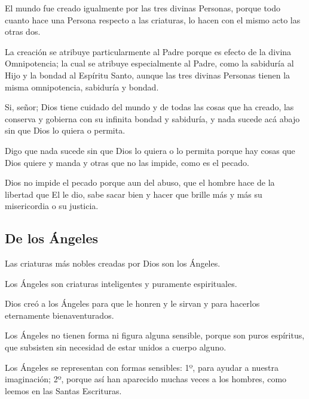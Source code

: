  El mundo fue creado igualmente por las tres divinas Personas, porque todo cuanto hace una Persona respecto a las criaturas, lo hacen con el mismo acto las otras dos.

 La creación se atribuye particularmente al Padre porque es efecto de la divina Omnipotencia; la cual se atribuye especialmente al Padre, como la sabiduría al Hijo y la bondad al Espíritu Santo, aunque las tres divinas Personas tienen la misma omnipotencia, sabiduría y bondad.

 Si, señor; Dios tiene cuidado del mundo y de todas las cosas que ha creado, las conserva y gobierna con su infinita bondad y sabiduría, y nada sucede acá abajo sin que Dios lo quiera o permita.

 Digo que nada sucede sin que Dios lo quiera o lo permita porque hay cosas que Dios quiere y manda y otras que no las impide, como es el pecado.

 Dios no impide el pecado porque aun del abuso, que el hombre hace de la libertad que El le dio, sabe sacar bien y hacer que brille más y más su misericordia o su justicia.


\subsection{De los Ángeles}

 Las criaturas
más nobles creadas por Dios son los Ángeles.

 Los Ángeles son criaturas inteligentes y
puramente espirituales.

 Dios creó a los Ángeles para que
le honren y le sirvan y para hacerlos eternamente bienaventurados.

 Los Ángeles no tienen forma ni
figura alguna sensible, porque son puros espíritus, que subsisten sin necesidad de
estar unidos a cuerpo alguno.

 Los
Ángeles se representan con formas sensibles: 1º, para ayudar a nuestra
imaginación; 2º, porque así han aparecido muchas veces a los hombres, como
leemos en las Santas Escrituras.

